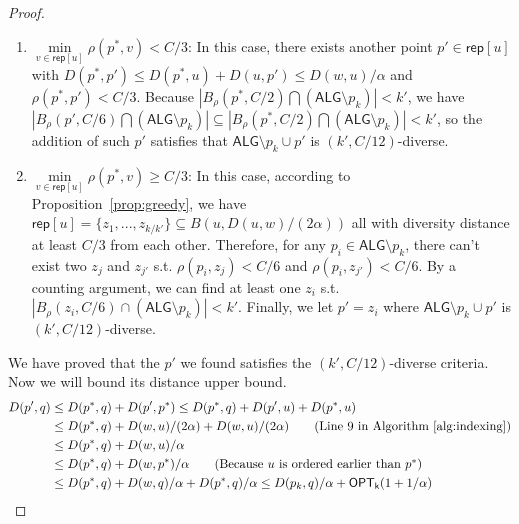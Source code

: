 \begin{proof}
\begin{enumerate}
\item $\min\limits_{v\in \mathsf{rep}[u]}\rho(p^*,v)<C/3$: In this case, there exists another point $p'\in \mathsf{rep}[u]$ with $D(p^*,p')\le D(p^*,u)+D(u,p')\le D(w,u)/\alpha$ and $\rho(p^*,p')<C/3$. Because $|B_{\rho}(p^*,C/2)\bigcap (\mathsf{ALG}\setminus p_k)|<k'$, we have $|B_{\rho}(p',C/6)\bigcap (\mathsf{ALG}\setminus p_k)|\subseteq |B_{\rho}(p^*,C/2)\bigcap (\mathsf{ALG}\setminus p_k)|<k'$, so the addition of such $p'$ satisfies that $\mathsf{ALG}\setminus p_k\cup p'$ is $(k',C/12)$-diverse. 
\item $\min\limits_{v\in \mathsf{rep}[u]}\rho(p^*,v)\ge C/3$: In this case, according to Proposition~\ref{prop:greedy}, we have $\mathsf{rep}[u]=\{z_1,...,z_{k/k'}\}\subseteq B(u,D(u,w)/(2\alpha))$ all with diversity distance at least $C/3$ from each other. Therefore, for any $p_i\in \mathsf{ALG}\setminus p_k$, there can't exist two $z_j$ and $z_{j'}$ s.t. $\rho(p_i,z_j)<C/6$ and $\rho(p_i,z_{j'})<C/6$. By a counting argument, we can find at least one $z_i$ s.t. $|B_{\rho}(z_i,C/6)\cap (\mathsf{ALG}\setminus p_k)|<k'$. Finally, we let $p'=z_i$ where $\mathsf{ALG}\setminus p_k \cup p'$ is $(k',C/12)$-diverse.
\end{enumerate}

We have proved that the $p'$ we found satisfies the $(k',C/12)$-diverse criteria. Now we will bound its distance upper bound.
\begin{align}
D(p',q)&\le D(p^*,q)+D(p',p^*) \le D(p^*,q)+D(p',u)+D(p^*,u) \notag\\
&\le D(p^*,q)+D(w,u)/(2\alpha)+D(w,u)/(2\alpha) \tag{Line 9 in Algorithm~\ref{alg:indexing}}\\
&\le D(p^*,q)+D(w,u)/\alpha \notag\\
&\le D(p^*,q)+D(w,p^*)/\alpha \tag{Because $u$ is ordered earlier than $p^*$}\\
&\le D(p^*,q)+D(w,q)/\alpha+D(p^*,q)/\alpha 
\le D(p_k,q)/\alpha+\mathsf{OPT_k}(1+1/\alpha)\notag
\end{align}

\end{proof}

